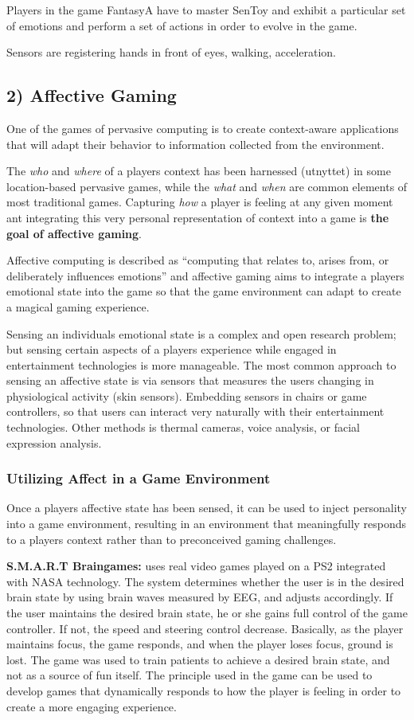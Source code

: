       Players in the game FantasyA have to master SenToy and exhibit a particular set of emotions and perform a set of actions in order to evolve in the game.

      Sensors are registering hands in front of eyes, walking, acceleration.

    \subsection*{2) Affective Gaming}
    One of the games of pervasive computing is to create context-aware applications that will adapt their behavior to information collected from the environment. 

    The {\it who} and {\it where} of a players context has been harnessed (utnyttet)  in some location-based pervasive games, while the {\it what} and {\it when} are common elements of most traditional games.
    Capturing {\it how} a player is feeling at any given moment ant integrating this very personal representation of context into a game is {\bf the goal of affective gaming}.

    Affective computing is described as ``computing that relates to, arises from, or deliberately influences emotions'' and affective gaming aims to integrate a players emotional state into the game so that the game environment can adapt to create a magical gaming experience.  

    Sensing an individuals emotional state is a complex and open research problem; but sensing certain aspects of a players experience while engaged in entertainment technologies is more manageable. The most common approach to sensing an affective state is via sensors that measures the users changing in physiological activity (skin sensors). Embedding sensors in chairs or game controllers, so that users can interact very naturally with their entertainment technologies. Other methods is thermal cameras, voice analysis, or facial expression analysis.  

      \subsubsection*{Utilizing Affect in a Game Environment}
      Once a players affective state has been sensed, it can be used to inject personality into a game environment, resulting in an environment that meaningfully responds to a players context rather than to preconceived gaming challenges. 

      {\bf S.M.A.R.T Braingames:} uses real video games played on a PS2 integrated with NASA technology. The system determines whether the user is in the desired brain state by using brain waves measured by EEG, and adjusts accordingly. If the user maintains the desired brain state, he or she gains full control of the game controller. If not, the speed and steering control decrease. Basically, as the player maintains focus, the game responds, and when the player loses focus, ground is lost. The game was used to train patients to achieve a desired brain state, and not as a source of fun itself. The principle used in the game can be used to develop games that dynamically responds to how the player is feeling in order to create a more engaging experience. 


